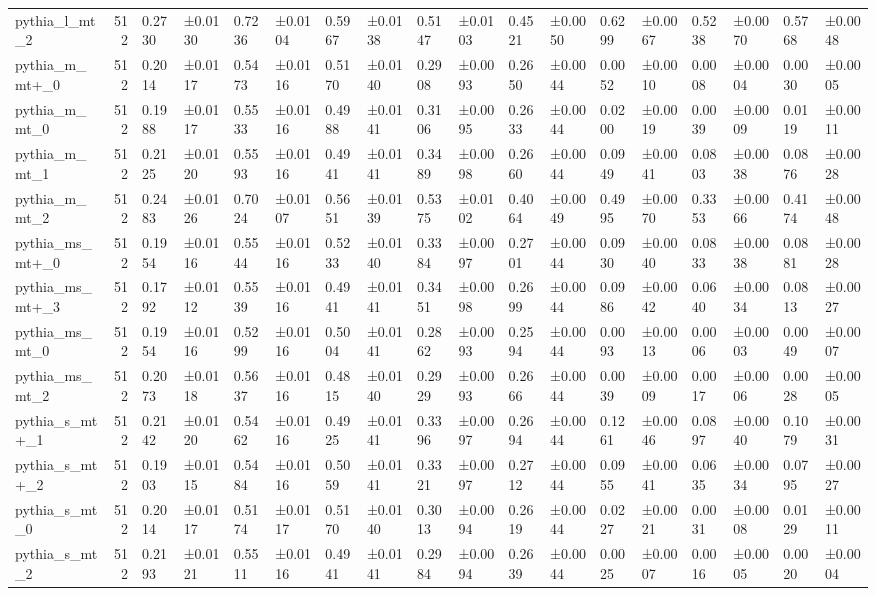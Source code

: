 \begin{tabular}{lrllllllllllllllll}
pythia\_l\_mt\_2 & 512 & 0.2730 & ±0.0130 & 0.7236 & ±0.0104 & 0.5967 & ±0.0138 & 0.5147 & ±0.0103 & 0.4521 & ±0.0050 & 0.6299 & ±0.0067 & 0.5238 & ±0.0070 & 0.5768 & ±0.0048 \\
pythia\_m\_mt+\_0 & 512 & 0.2014 & ±0.0117 & 0.5473 & ±0.0116 & 0.5170 & ±0.0140 & 0.2908 & ±0.0093 & 0.2650 & ±0.0044 & 0.0052 & ±0.0010 & 0.0008 & ±0.0004 & 0.0030 & ±0.0005 \\
pythia\_m\_mt\_0 & 512 & 0.1988 & ±0.0117 & 0.5533 & ±0.0116 & 0.4988 & ±0.0141 & 0.3106 & ±0.0095 & 0.2633 & ±0.0044 & 0.0200 & ±0.0019 & 0.0039 & ±0.0009 & 0.0119 & ±0.0011 \\
pythia\_m\_mt\_1 & 512 & 0.2125 & ±0.0120 & 0.5593 & ±0.0116 & 0.4941 & ±0.0141 & 0.3489 & ±0.0098 & 0.2660 & ±0.0044 & 0.0949 & ±0.0041 & 0.0803 & ±0.0038 & 0.0876 & ±0.0028 \\
pythia\_m\_mt\_2 & 512 & 0.2483 & ±0.0126 & 0.7024 & ±0.0107 & 0.5651 & ±0.0139 & 0.5375 & ±0.0102 & 0.4064 & ±0.0049 & 0.4995 & ±0.0070 & 0.3353 & ±0.0066 & 0.4174 & ±0.0048 \\
pythia\_ms\_mt+\_0 & 512 & 0.1954 & ±0.0116 & 0.5544 & ±0.0116 & 0.5233 & ±0.0140 & 0.3384 & ±0.0097 & 0.2701 & ±0.0044 & 0.0930 & ±0.0040 & 0.0833 & ±0.0038 & 0.0881 & ±0.0028 \\
pythia\_ms\_mt+\_3 & 512 & 0.1792 & ±0.0112 & 0.5539 & ±0.0116 & 0.4941 & ±0.0141 & 0.3451 & ±0.0098 & 0.2699 & ±0.0044 & 0.0986 & ±0.0042 & 0.0640 & ±0.0034 & 0.0813 & ±0.0027 \\
pythia\_ms\_mt\_0 & 512 & 0.1954 & ±0.0116 & 0.5299 & ±0.0116 & 0.5004 & ±0.0141 & 0.2862 & ±0.0093 & 0.2594 & ±0.0044 & 0.0093 & ±0.0013 & 0.0006 & ±0.0003 & 0.0049 & ±0.0007 \\
pythia\_ms\_mt\_2 & 512 & 0.2073 & ±0.0118 & 0.5637 & ±0.0116 & 0.4815 & ±0.0140 & 0.2929 & ±0.0093 & 0.2666 & ±0.0044 & 0.0039 & ±0.0009 & 0.0017 & ±0.0006 & 0.0028 & ±0.0005 \\
pythia\_s\_mt+\_1 & 512 & 0.2142 & ±0.0120 & 0.5462 & ±0.0116 & 0.4925 & ±0.0141 & 0.3396 & ±0.0097 & 0.2694 & ±0.0044 & 0.1261 & ±0.0046 & 0.0897 & ±0.0040 & 0.1079 & ±0.0031 \\
pythia\_s\_mt+\_2 & 512 & 0.1903 & ±0.0115 & 0.5484 & ±0.0116 & 0.5059 & ±0.0141 & 0.3321 & ±0.0097 & 0.2712 & ±0.0044 & 0.0955 & ±0.0041 & 0.0635 & ±0.0034 & 0.0795 & ±0.0027 \\
pythia\_s\_mt\_0 & 512 & 0.2014 & ±0.0117 & 0.5174 & ±0.0117 & 0.5170 & ±0.0140 & 0.3013 & ±0.0094 & 0.2619 & ±0.0044 & 0.0227 & ±0.0021 & 0.0031 & ±0.0008 & 0.0129 & ±0.0011 \\
pythia\_s\_mt\_2 & 512 & 0.2193 & ±0.0121 & 0.5511 & ±0.0116 & 0.4941 & ±0.0141 & 0.2984 & ±0.0094 & 0.2639 & ±0.0044 & 0.0025 & ±0.0007 & 0.0016 & ±0.0005 & 0.0020 & ±0.0004 \\
\bottomrule
\end{tabular}

